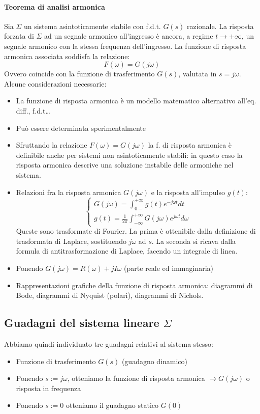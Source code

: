 \documentclass[11pt]{article}
\begin{document}
\paragraph{Teorema di analisi armonica}
Sia $\Sigma$ un sistema asintoticamente stabile con f.d.t. $G(s)$ razionale. La risposta forzata di $\Sigma$ ad un segnale armonico all'ingresso è ancora, a regime $t\rightarrow+\infty$, un segnale armonico con la stessa frequenza dell'ingresso. La funzione di risposta armonica associata soddisfa la relazione:
\begin{displaymath}
    F(\omega) = G(j\omega)
\end{displaymath}
Ovvero coincide con la funzione di trasferimento $G(s)$, valutata in $s=j\omega$.
Alcune considerazioni necessarie:
\begin{itemize}
    \item La funzione di risposta armonica è un modello matematico alternativo all'eq. diff., f.d.t\dots
    \item Può essere determinata sperimentalmente
    \item Sfruttando la relazione $F(\omega) = G(j\omega)$ la f. di risposta armonica è definibile anche per sistemi non asintoticamente stabili: in questo caso la risposta armonica descrive una soluzione instabile delle armoniche nel sistema.
    \item Relazioni fra la risposta armonica $G(j\omega)$ e la risposta all'impulso $g(t)$:\begin{displaymath}
              \begin{cases}
                  G(j\omega) = \int_{0-}^{+\infty} g(t)e^{-j\omega t}dt \\
                  g(t) = \frac{1}{2\pi}\int_{-\infty}^{+\infty} G(j\omega)e^{j\omega t}d\omega
              \end{cases}
          \end{displaymath}
          Queste sono trasformate di Fourier. La prima è ottenibile dalla definizione di trasformata di Laplace, sostituendo $j\omega$ ad $s$. La seconda si ricava dalla formula di antitrasformazione di Laplace, facendo un integrale di linea.
    \item Ponendo $G(j\omega) = R(\omega) + jI\omega$ (parte reale ed immaginaria)
    \item Rappresentazioni grafiche della funzione di risposta armonica: diagrammi di Bode, diagrammi di Nyquist (polari), diagrammi di Nichols.
\end{itemize}

\subsection{Guadagni del sistema lineare $\Sigma$}
Abbiamo quindi individuato tre guadagni relativi al sistema stesso:
\begin{itemize}
    \item Funzione di trasferimento $G(s)$ (guadagno dinamico)
    \item Ponendo $s:=j\omega$, otteniamo la funzione di risposta armonica $\rightarrow G(j\omega)$ o risposta in frequenza
    \item Ponendo $s:=0$ otteniamo il guadagno statico $G(0)$
\end{itemize}
\end{document}
